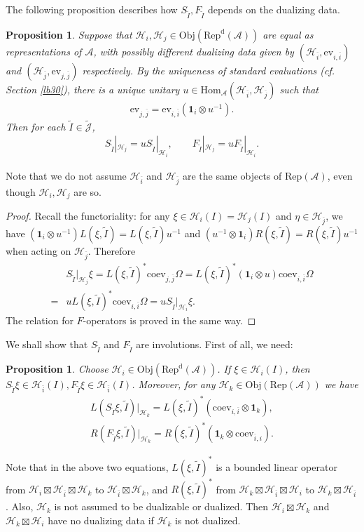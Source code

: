 \documentclass[12pt,a4paper]{article}
\theoremstyle{definition}
\theoremstyle{plain}
\newtheorem{pp}[df]{Proposition}
\newcommand{\mc}{\mathcal}
\newcommand{\wtd}{\widetilde}
\newcommand{\ovl}{\overline}
\newcommand{\id}{\mathbf{1}}
\newcommand{\Hom}{\mathrm{Hom}}
\newcommand{\ev}{\mathrm{ev}}
\newcommand{\coev}{\mathrm{coev}}
\newcommand{\Jtd}{\widetilde{\mathcal J}}
\newcommand{\RepA}{\mathrm{Rep}(\mc A)}
\newcommand{\RepdA}{\mathrm{Rep}^{\mathrm d}(\mc A)}
\newcommand{\Obj}{\mathrm{Obj}}
\numberwithin{equation}{section}
\begin{document}
The following proposition describes how $S_{\wtd I},F_{\wtd I}$ depends on the dualizing data.


\begin{pp}\label{lb8}
Suppose that $\mc H_i,\mc H_j\in\Obj(\RepdA)$ are equal as representations of $\mc A$, with possibly different dualizing data  given by $(\mc H_{\ovl i},\ev_{i,\ovl i})$ and $(\mc H_{\ovl j},\ev_{j,\ovl j})$ respectively. By the uniqueness of standard evaluations (cf. Section \ref{lb30}), there is a unique unitary $u\in\Hom_{\mc A}(\mc H_{\ovl i},\mc H_{\ovl j})$ such that
\begin{align*}
	\ev_{j,\ovl j}=\ev_{i,\ovl i}(\id_i\otimes u^{-1}).
\end{align*}
Then for each $\wtd I\in\Jtd$,
\begin{align*}
S_{\wtd I}|_{\mc H_j}=uS_{\wtd I}|_{\mc H_i},\qquad F_{\wtd I}|_{\mc H_j}=uF_{\wtd I}|_{\mc H_i}.
\end{align*}
\end{pp}

Note that we do not assume $\mc H_{\ovl i}$ and $\mc H_{\ovl j}$ are the same objects of $\RepA$, even though $\mc H_i,\mc H_j$ are so.

\begin{proof}
Recall the functoriality: for any $\xi\in\mc H_i(I)=\mc H_j(I)$ and $\eta\in\mc H_{\ovl j}$, we have $(\id_i\otimes u^{-1})L(\xi,\wtd I)=L(\xi,\wtd I)u^{-1}$ and $(u^{-1}\otimes\id_i)R(\xi,\wtd I)=R(\xi,\wtd I)u^{-1}$ when acting on $\mc H_{\ovl j}$. Therefore
\begin{align*}
&S_{\wtd I}|_{\mc H_j}\xi=L(\xi,\wtd I)^*\coev_{j,\ovl j}\Omega=	L(\xi,\wtd I)^*(\id_i\otimes u)\coev_{i,\ovl i}\Omega\\
=&uL(\xi,\wtd I)^*\coev_{i,\ovl i}\Omega=uS_{\wtd I}|_{\mc H_i}\xi.
\end{align*}
The relation for $F$-operators is proved in the same way.
\end{proof}

We shall show that  $S_{\wtd I}$ and $F_{\wtd I}$ are involutions. First of all, we need:

\begin{pp}\label{lb7}
Choose $\mc H_i\in\Obj(\RepdA)$. If $\xi\in\mc H_i(I)$, then $S_{\wtd I}\xi\in\mc H_{\ovl i}(I),F_{\wtd I}\xi\in\mc H_{\ovl i}(I)$. Moreover, for any $\mc H_k\in\Obj(\RepA)$ we have
\begin{gather}
L(S_{\wtd I}\xi,\wtd I)|_{\mc H_k}=L(\xi,\wtd I)^*(\coev_{i,\ovl i}\otimes\id_k),\label{eq13}\\
R(F_{\wtd I}\xi,\wtd I)|_{\mc H_k}=R(\xi,\wtd I)^*(\id_k\otimes\coev_{\ovl i,i}).\label{eq14}
\end{gather}
\end{pp}
Note that in the above two equations, $L(\xi,\wtd I)^*$ is a bounded linear operator from $\mc H_i\boxtimes\mc H_{\ovl i}\boxtimes\mc H_k$ to $\mc H_{\ovl i}\boxtimes\mc H_k$, and $R(\xi,\wtd I)^*$ from $\mc H_k\boxtimes\mc H_{\ovl i}\boxtimes\mc H_i$ to $\mc H_k\boxtimes\mc H_{\ovl i}$. Also, $\mc H_k$ is not assumed to be dualizable or dualized. Then $\mc H_i\boxtimes\mc H_k$ and $\mc H_k\boxtimes\mc H_i$ have no dualizing data if $\mc H_k$ is not dualized.
\end{document}

